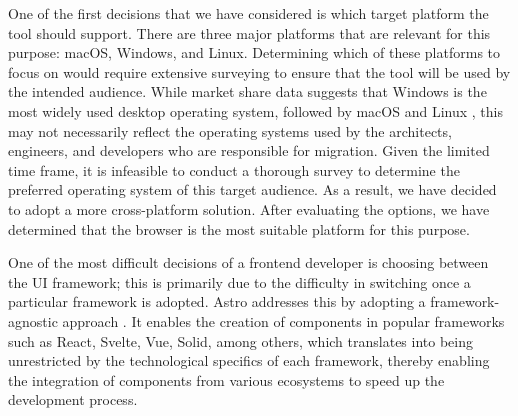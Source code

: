 One of the first decisions that we have considered is which target platform the
tool should support. There are three major platforms that are relevant for this
purpose: macOS, Windows, and Linux. Determining which of these platforms to
focus on would require extensive surveying to ensure that the tool will be used
by the intended audience. While market share data suggests that Windows is the
most widely used desktop operating system, followed by macOS and Linux
\cite{desktop-usage-worldwide}, this may not necessarily reflect the operating
systems used by the architects, engineers, and developers who are responsible
for migration. Given the limited time frame, it is infeasible to conduct a
thorough survey to determine the preferred operating system of this target
audience. As a result, we have decided to adopt a more cross-platform solution.
After evaluating the options, we have determined that the browser is the most
suitable platform for this purpose.

One of the most difficult decisions of a frontend developer is choosing between
the UI framework; this is primarily due to the difficulty in switching once a
particular framework is adopted. Astro addresses this by adopting a
framework-agnostic approach \cite{astro}. It enables the creation of components
in popular frameworks such as React, Svelte, Vue, Solid, among others, which
translates into being unrestricted by the technological specifics of each
framework, thereby enabling the integration of components from various
ecosystems to speed up the development process.
